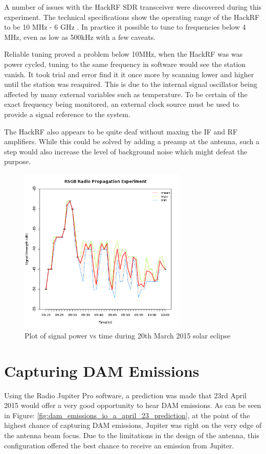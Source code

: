 \documentclass[runningheads,a4paper]{llncs}
\begin{document}
A number of issues with the HackRF \gls{SDR} transceiver were discovered during this experiment. The technical specifications show the operating range of the HackRF to be 10 MHz - 6 GHz \citep{ossmann-15-d}. In practice it possible to tune to frequencies below 4 MHz, even as low as 500kHz with a few caveats.

Reliable tuning proved a problem below 10MHz, when the HackRF was was power cycled, tuning to the same frequency in software would see the station vanish. It took trial and error find it it once more by scanning lower and higher until the station was reaquired. This is due to the internal signal oscillator being affected by many external variables such as temperature. To be certain of the exact frequency being monitored, an external clock source must be used to provide a signal reference to the system. 

The HackRF also appears to be quite deaf without maxing the IF and \gls{RF} amplifiers. While this could be solved by adding a \gls{preamp} at the antenna, such a step would also increase the level of background noise which might defeat the purpose.

%
\begin{figure}[here]
	\centering
	\includegraphics[width=8cm]{images/67}
	\caption{Plot of signal power vs time during 20th March 2015 solar eclipse}
	\label{fig:signal_power_v_time_radio_propagation}
\end{figure}
%


\newpage
\section*{Capturing DAM Emissions}
Using the Radio Jupiter Pro software, a prediction was made that 23rd April 2015 would offer a very good opportunity to hear \gls{DAM} emissions. As can be seen in Figure: \ref{fig:dam_emissions_io_a_april_23_prediction}, at the point of the highest chance of capturing \gls{DAM} emissions, Jupiter was right on the very edge of the antenna beam focus. Due to the limitations in the design of the antenna, this configuration offered the best chance to receive an emission from Jupiter.
\end{document}
